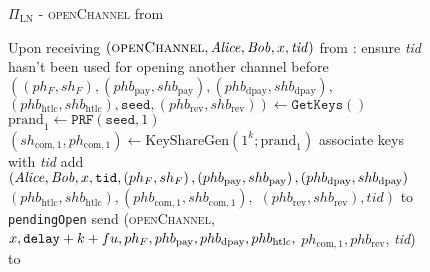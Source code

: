  \begin{figure}[H]
    \begin{protocolbox}{$\Pi_{\mathrm{LN}}$ - \textsc{openChannel} from
    \environment}
      \begin{algorithmic}[1]
        \State Upon receiving $\left(\textsc{openChannel}, \mathit{Alice}, \mathit{Bob}, x,
        \mathit{tid}\right)$ from \environment:
        \Indent
          \State ensure \textit{tid} hasn't been used for opening another
          channel before
          \label{alg:protocol:open:env:valid}
          \State $\left(\left(ph_F, sh_F\right), \left(phb_{\mathrm{pay}},
          shb_{\mathrm{pay}}\right), \left(phb_{\mathrm{dpay}},
          shb_{\mathrm{dpay}}\right),\right.$ $\left.\left(phb_{\mathrm{htlc}},
          shb_{\mathrm{htlc}}\right), \mathtt{seed}, \left(phb_{\mathrm{rev}},
          shb_{\mathrm{rev}}\right)\right) \gets \texttt{GetKeys}\left(\right)$
          \State $\mathrm{prand}_1 \gets \texttt{PRF}\left(\mathtt{seed},
          1\right)$
          \State $\left(sh_{\mathrm{com}, 1}, ph_{\mathrm{com}, 1}\right) \gets
          \mathrm{KeyShareGen}\left(1^k; \mathrm{prand}_1\right)$
          \State associate keys with \textit{tid}
          \State add $\left(\mathit{Alice}, \mathit{Bob}, x, \mathtt{tid}, \left(ph_F,
          sh_F\right), \left(phb_{\mathrm{pay}}, shb_{\mathrm{pay}}\right),
          \left(phb_{\mathrm{dpay}}, shb_{\mathrm{dpay}}\right)\right.$
          $\left.\left(phb_{\mathrm{htlc}}, shb_{\mathrm{htlc}}\right),
          \left(phb_{\mathrm{com}, 1}, shb_{\mathrm{com}, 1}\right),\right.$
          $\left.\left(phb_{\mathrm{rev}}, shb_{\mathrm{rev}}\right),
          \mathit{tid}\right)$ to \texttt{pendingOpen}
          \label{alg:protocol:open:env:pendingOpen}
          \State send (\textsc{openChannel}, $x, \mathtt{delay} + k + fu,
          ph_F, phb_{\mathrm{pay}}, phb_{\mathrm{dpay}}, phb_{\mathrm{htlc}},$
          $ph_{\mathrm{com}, 1}, phb_{\mathrm{rev}}$, \textit{tid}) to \bob{}
        \EndIndent
      \end{algorithmic}
    \end{protocolbox}
    \caption{}
    \label{alg:protocol:open:env}
  \end{figure}

